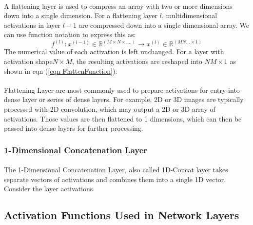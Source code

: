 \documentclass[12pt,letterpaper]{article}
\begin{document}
\paragraph*{}A flattening layer is used to compress an array with two or more dimensions down into a single dimension. For a flattening layer $l$, multidimensional activations in layer $l-1$ are compressed down into a single dimensional array. We can use function notation to express this as:
\begin{equation}
\label{eqn-FlattenFunction}
f^{(l)} : x^{(l-1)} \in \mathbb{R}^{(M \times N \times ....)} \rightarrow
x^{(l)} \in \mathbb{R}^{(MN...\times 1)}
\end{equation}
The numerical value of each activation is left unchanged. For a layer with activation shape$N \times M$, the resulting activations are reshaped into $NM \times 1$ as shown in eqn (\ref{eqn-FlattenFunction}).

\paragraph*{}Flattening Layer are most commonly used to prepare activations for entry into dense layer or series of dense layers. For example, 2D or 3D images are typically processed with 2D convolution, which may output a 2D or 3D array of activations. Those values are then flattened to 1 dimensions, which can then be passed into dense layers for further processing.


\subsubsection{1-Dimensional Concatenation Layer}

\paragraph*{}The 1-Dimensional Concatenation Layer, also called 1D-Concat layer takes separate vectors of activations and combines them into a single 1D vector. Consider the layer activations 


\subsection{Activation Functions Used in Network Layers}
\label{sec-ActivationFunctions}
\end{document}
